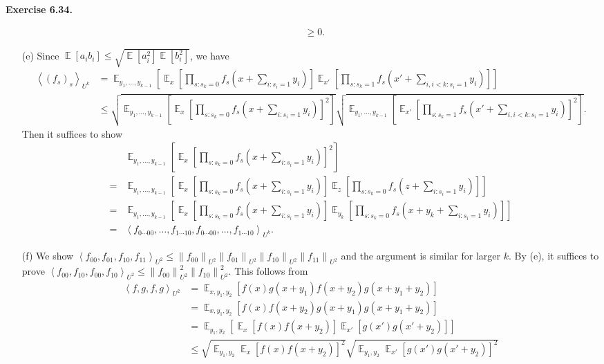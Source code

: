 \documentclass[a4paper]{article}
\newenvironment{exercise}[1]{
	\par
	\noindent\textbf{Exercise #1.}\quad
}{
	\par
	\bigskip
}
\DeclareMathOperator*{\E}{\mathbb E}
\newcommand{\vabs}[1]{{\left\| #1 \right\|}}
\newcommand{\abra}[1]{{\left\langle #1 \right\rangle}}
\newcommand{\sbra}[1]{{\left[ #1 \right]}}
\begin{document}
\begin{exercise}{6.34}
\begin{itemize}
\begin{align*}
                &\geq0.
            \end{align*}
        \item[(e)] Since $\E[a_ib_i]\leq\sqrt{\E[a_i^2]\E[b_i^2]}$, we have
            \begin{align*}
            \abra{(f_s)_s}_{U^k}
                &=\E_{y_1,\ldots,y_{k-1}}\sbra{\E_x\sbra{\prod_{s:s_k=0}f_s(x+\sum_{i:s_i=1}y_i)}\E_{x'}\sbra{\prod_{s:s_k=1}f_s(x'+\sum_{i,i<k:s_i=1}y_i)}}\\
                &\leq\sqrt{\E_{y_1,\ldots,y_{k-1}}\sbra{\E_x\sbra{\prod_{s:s_k=0}f_s(x+\sum_{i:s_i=1}y_i)}^2}}
                \sqrt{\E_{y_1,\ldots,y_{k-1}}\sbra{\E_{x'}\sbra{\prod_{s:s_k=1}f_s(x'+\sum_{i,i<k:s_i=1}y_i)}^2}}.
            \end{align*}
            Then it suffices to show 
            \begin{align*}
                &\E_{y_1,\ldots,y_{k-1}}\sbra{\E_x\sbra{\prod_{s:s_k=0}f_s(x+\sum_{i:s_i=1}y_i)}^2}\\
                =&\E_{y_1,\ldots,y_{k-1}}\sbra{\E_x\sbra{\prod_{s:s_k=0}f_s(x+\sum_{i:s_i=1}y_i)}\E_z\sbra{\prod_{s:s_k=0}f_s(z+\sum_{i:s_i=1}y_i)}}\\
                =&\E_{y_1,\ldots,y_{k-1}}\sbra{\E_x\sbra{\prod_{s:s_k=0}f_s(x+\sum_{i:s_i=1}y_i)}\E_{y_k}\sbra{\prod_{s:s_k=0}f_s(x+y_k+\sum_{i:s_i=1}y_i)}}\\
                =&\abra{f_{0\cdots00},\ldots,f_{1\cdots10},f_{0\cdots00},\ldots,f_{1\cdots10}}_{U^k}.
            \end{align*}
        \item[(f)] We show $\abra{f_{00},f_{01},f_{10},f_{11}}_{U^2}\leq\vabs{f_{00}}_{U^2}\vabs{f_{01}}_{U^2}\vabs{f_{10}}_{U^2}\vabs{f_{11}}_{U^2}$ and the argument is similar for larger $k$.
            By (e), it suffices to prove $\abra{f_{00},f_{10},f_{00},f_{10}}_{U^2}\leq\vabs{f_{00}}_{U^2}^2\vabs{f_{10}}_{U^2}^2$.
            This follows from
            \begin{align*}
                \abra{f,g,f,g}_{U^2}
                &=\E_{x,y_1,y_2}\sbra{f(x)g(x+y_1)f(x+y_2)g(x+y_1+y_2)}\\
                &=\E_{x,y_1,y_2}\sbra{f(x)f(x+y_2)g(x+y_1)g(x+y_1+y_2)}\\
                &=\E_{y_1,y_2}\sbra{\E_x\sbra{f(x)f(x+y_2)}\E_{x'}\sbra{g(x')g(x'+y_2)}}\\
                &\leq\sqrt{\E_{y_1,y_2}\E_x\sbra{f(x)f(x+y_2)}^2}\sqrt{\E_{y_1,y_2}\E_{x'}\sbra{g(x')g(x'+y_2)}^2}\\

\end{align*}
\end{itemize}
\end{exercise}
\end{document}
